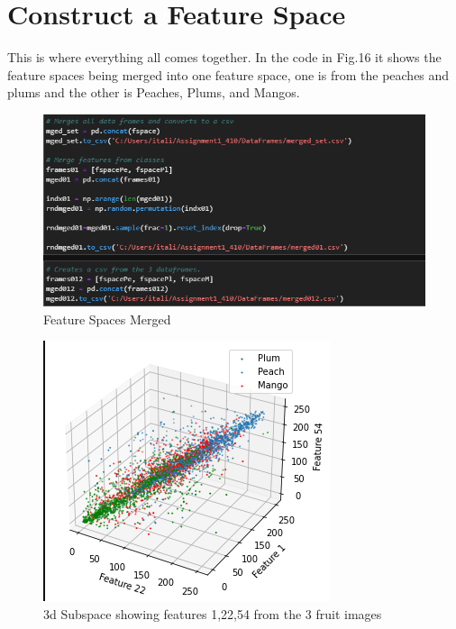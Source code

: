 \documentclass[conference]{IEEEtran}
\begin{document}
\section{Construct a Feature Space}
This is where everything all comes together. In the code in Fig.16 it shows the feature spaces being merged into one feature space, one is from the peaches and plums and the other is Peaches, Plums, and Mangos.

\begin{figure}[h]
  \centering
  \includegraphics[width=\linewidth]{feature_space.png}
  \caption{Feature Spaces Merged}
\end{figure}

\begin{figure}[h]
  \centering
  \includegraphics[width=\linewidth]{3dfeature.png}
  \caption{3d Subspace showing features 1,22,54 from the 3 fruit images}
\end{figure}
\end{document}
